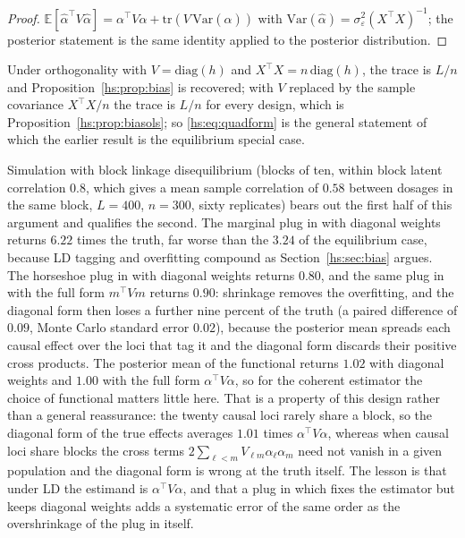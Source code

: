 \begin{proof}
$\mathbb{E}[\hat\alpha^\top V \hat\alpha] = \alpha^\top V\alpha + \mathrm{tr}(V\,\mathrm{Var}(\hat\alpha))$ with $\mathrm{Var}(\hat\alpha) = \sigma^2_\varepsilon (X^\top X)^{-1}$; the posterior statement is the same identity applied to the posterior distribution.
\end{proof}

Under orthogonality with $V = \mathrm{diag}(h)$ and $X^\top X = n\,\mathrm{diag}(h)$, the trace is $L/n$ and Proposition~\ref{hs:prop:bias} is recovered; with $V$ replaced by the sample covariance $X^\top X/n$ the trace is $L/n$ for every design, which is Proposition~\ref{hs:prop:biasols}; so \eqref{hs:eq:quadform} is the general statement of which the earlier result is the equilibrium special case.

Simulation with block linkage disequilibrium (blocks of ten, within block latent correlation $0.8$, which gives a mean sample correlation of $0.58$ between dosages in the same block, $L = 400$, $n = 300$, sixty replicates) bears out the first half of this argument and qualifies the second. The marginal plug in with diagonal weights returns $6.22$ times the truth, far worse than the $3.24$ of the equilibrium case, because LD tagging and overfitting compound as Section~\ref{hs:sec:bias} argues. The horseshoe plug in with diagonal weights returns $0.80$, and the same plug in with the full form $m^\top Vm$ returns $0.90$: shrinkage removes the overfitting, and the diagonal form then loses a further nine percent of the truth (a paired difference of $0.09$, Monte Carlo standard error $0.02$), because the posterior mean spreads each causal effect over the loci that tag it and the diagonal form discards their positive cross products. The posterior mean of the functional returns $1.02$ with diagonal weights and $1.00$ with the full form $\alpha^\top V\alpha$, so for the coherent estimator the choice of functional matters little here. That is a property of this design rather than a general reassurance: the twenty causal loci rarely share a block, so the diagonal form of the true effects averages $1.01$ times $\alpha^\top V\alpha$, whereas when causal loci share blocks the cross terms $2\sum_{\ell<m}V_{\ell m}\alpha_\ell\alpha_m$ need not vanish in a given population and the diagonal form is wrong at the truth itself. The lesson is that under LD the estimand is $\alpha^\top V\alpha$, and that a plug in which fixes the estimator but keeps diagonal weights adds a systematic error of the same order as the overshrinkage of the plug in itself.

